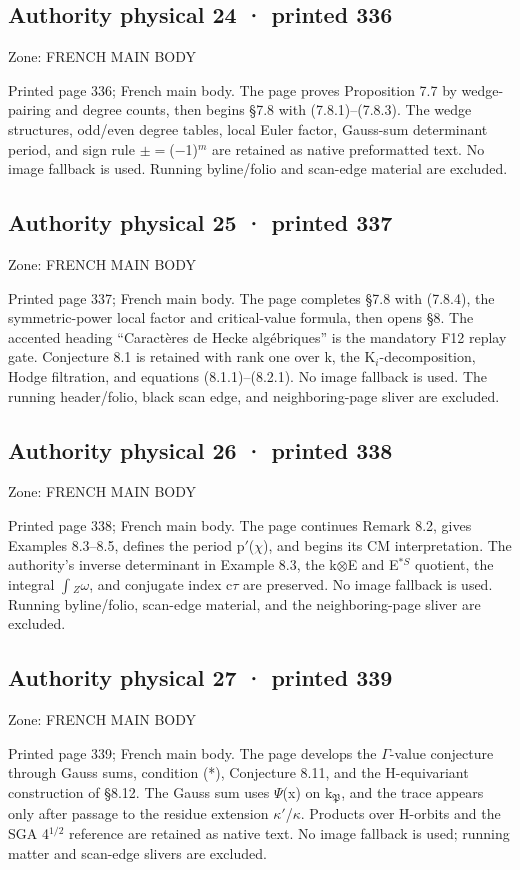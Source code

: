 \documentclass[10pt,twoside]{article}
\begin{document}
\subsection*{Authority physical 24 · printed 336}
\noindent\textsf{Zone: FRENCH MAIN BODY}\par
Printed page 336; French main body. The page proves Proposition 7.7 by wedge-pairing and degree counts, then begins \S{}7.8 with (7.8.1)–(7.8.3). The wedge structures, odd/even degree tables, local Euler factor, Gauss-sum determinant period, and sign rule \ensuremath{±}\ensuremath{=}(\ensuremath{−}1)\ensuremath{^{m}} are retained as native preformatted text. No image fallback is used. Running byline/folio and scan-edge material are excluded.\par
\subsection*{Authority physical 25 · printed 337}
\noindent\textsf{Zone: FRENCH MAIN BODY}\par
Printed page 337; French main body. The page completes \S{}7.8 with (7.8.4), the symmetric-power local factor and critical-value formula, then opens \S{}8. The accented heading “Caractères de Hecke algébriques” is the mandatory F12 replay gate. Conjecture 8.1 is retained with rank one over k, the K\ensuremath{_{i}}-decomposition, Hodge filtration, and equations (8.1.1)–(8.2.1). No image fallback is used. The running header/folio, black scan edge, and neighboring-page sliver are excluded.\par
\subsection*{Authority physical 26 · printed 338}
\noindent\textsf{Zone: FRENCH MAIN BODY}\par
Printed page 338; French main body. The page continues Remark 8.2, gives Examples 8.3–8.5, defines the period p\ensuremath{′}(\ensuremath{χ}), and begins its CM interpretation. The authority’s inverse determinant in Example 8.3, the k\ensuremath{⊗}E and E\ensuremath{^{*S}} quotient, the integral \ensuremath{∫}\ensuremath{_{Z}}\ensuremath{ω}, and conjugate index c\ensuremath{τ} are preserved. No image fallback is used. Running byline/folio, scan-edge material, and the neighboring-page sliver are excluded.\par
\subsection*{Authority physical 27 · printed 339}
\noindent\textsf{Zone: FRENCH MAIN BODY}\par
Printed page 339; French main body. The page develops the \ensuremath{Γ}-value conjecture through Gauss sums, condition (*), Conjecture 8.11, and the H-equivariant construction of \S{}8.12. The Gauss sum uses \ensuremath{Ψ}(x) on k\ensuremath{_{𝔓}}, and the trace appears only after passage to the residue extension \ensuremath{κ}\ensuremath{′}/\ensuremath{κ}. Products over H-orbits and the SGA 4\ensuremath{^{1/2}} reference are retained as native text. No image fallback is used; running matter and scan-edge slivers are excluded.\par
\end{document}
